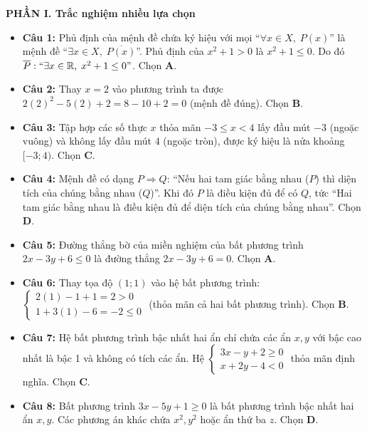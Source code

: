 \documentclass[12pt,a4paper]{article}
\newcommand{\parttitle}[1]{\par\vspace{2pt}{\large\bfseries\color{ink}#1}\par\vspace{1pt}}
\begin{document}
\newpage
\parttitle{HƯỚNG DẪN GIẢI CHI TIẾT}

\textbf{PHẦN I. Trắc nghiệm nhiều lựa chọn}
\begin{itemize}[leftmargin=0.6cm, itemsep=3pt]
    \item \textbf{Câu 1:} Phủ định của mệnh đề chứa ký hiệu với mọi ``$\forall x \in X,\; P(x)$'' là mệnh đề ``$\exists x \in X,\; \overline{P(x)}$''. Phủ định của $x^2 + 1 > 0$ là $x^2 + 1 \le 0$. Do đó $\overline{P}: ``\exists x \in \mathbb{R},\; x^2 + 1 \le 0"$. Chọn \textbf{A}.
    \item \textbf{Câu 2:} Thay $x = 2$ vào phương trình ta được $2(2)^2 - 5(2) + 2 = 8 - 10 + 2 = 0$ (mệnh đề đúng). Chọn \textbf{B}.
    \item \textbf{Câu 3:} Tập hợp các số thực $x$ thỏa mãn $-3 \le x < 4$ lấy đầu mút $-3$ (ngoặc vuông) và không lấy đầu mút $4$ (ngoặc tròn), được ký hiệu là nửa khoảng $[-3; 4)$. Chọn \textbf{C}.
    \item \textbf{Câu 4:} Mệnh đề có dạng $P \Rightarrow Q$: ``Nếu hai tam giác bằng nhau ($P$) thì diện tích của chúng bằng nhau ($Q$)''. Khi đó $P$ là điều kiện đủ để có $Q$, tức ``Hai tam giác bằng nhau là điều kiện đủ để diện tích của chúng bằng nhau''. Chọn \textbf{D}.
    \item \textbf{Câu 5:} Đường thẳng bờ của miền nghiệm của bất phương trình $2x - 3y + 6 \le 0$ là đường thẳng $2x - 3y + 6 = 0$. Chọn \textbf{A}.
    \item \textbf{Câu 6:} Thay tọa độ $(1; 1)$ vào hệ bất phương trình:
    $\begin{cases} 2(1) - 1 + 1 = 2 > 0 \\ 1 + 3(1) - 6 = -2 \le 0 \end{cases}$ (thỏa mãn cả hai bất phương trình). Chọn \textbf{B}.
    \item \textbf{Câu 7:} Hệ bất phương trình bậc nhất hai ẩn chỉ chứa các ẩn $x, y$ với bậc cao nhất là bậc 1 và không có tích các ẩn. Hệ $\begin{cases} 3x - y + 2 \ge 0 \\ x + 2y - 4 < 0 \end{cases}$ thỏa mãn định nghĩa. Chọn \textbf{C}.
    \item \textbf{Câu 8:} Bất phương trình $3x - 5y + 1 \ge 0$ là bất phương trình bậc nhất hai ẩn $x, y$. Các phương án khác chứa $x^2, y^2$ hoặc ẩn thứ ba $z$. Chọn \textbf{D}.

\end{itemize}
\end{document}
